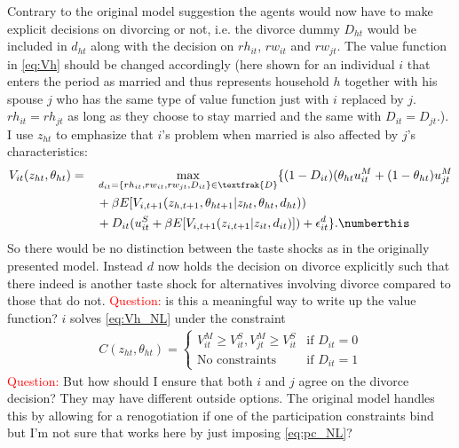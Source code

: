 Contrary to the original model suggestion the agents would now have to make explicit decisions on divorcing or not, i.e. the divorce dummy $D_{ht}$ would be included in $d_{ht}$ along with the decision on $rh_{it}$, $rw_{it}$ and $rw_{jt}$. The value function in \eqref{eq:Vh} should be changed accordingly (here shown for an individual $i$ that enters the period as married and thus represents household $h$ together with his spouse $j$ who has the same type of value function just with $i$ replaced by $j$. $rh_{it}=rh_{jt}$ as long as they choose to stay married and the same with $D_{it}=D_{jt}$.). I use $z_{ht}$ to emphasize that $i$'s problem when married is also affected by $j$'s characteristics:
\begin{alignat*}{3}
&V_{it}(z_{ht},\theta_{ht})=&&\max_{d_{it}=\{rh_{it},rw_{it},rw_{jt},D_{it}\}\in \textfrak{D}} \{(1-D_{it})(\theta_{ht} u_{it}^M+(1-\theta_{ht})u_{jt}^M \\
& &&+\beta E[V_{i,t+1}(z_{h,t+1},\theta_{ht+1}|z_{ht},\theta_{ht},d_{ht})) \\
& &&+D_{it}(u_{it}^S+\beta E[V_{i,t+1}(z_{i,t+1}|z_{it},d_{it})] )+\epsilon_{it}^d\}. \numberthis
\label{eq:Vh_NL}
\end{alignat*}
So there would be no distinction between the taste shocks as in the originally presented model. Instead $d$ now holds the decision on divorce explicitly such that there indeed is another taste shock for alternatives involving divorce compared to those that do not. \textcolor{red}{Question:} is this a meaningful way to write up the value function? $i$ solves \eqref{eq:Vh_NL} under the constraint
\begin{align}
C(z_{ht},\theta_{ht}) = \begin{cases} V_{it}^M \geq V_{it}^S, V_{jt}^M \geq V_{it}^S & \text{if } D_{it}=0 \\
                      \text{No constraints}   & \text{if } D_{it}=1      %
        \end{cases}
        \label{eq:pc_NL}
\end{align}
\textcolor{red}{Question:} But how should I ensure that both $i$ and $j$ agree on the divorce decision? They may have different outside options. The original model handles this by allowing for a renogotiation if one of the participation constraints bind but I'm not sure that works here by just imposing \eqref{eq:pc_NL}?

 







